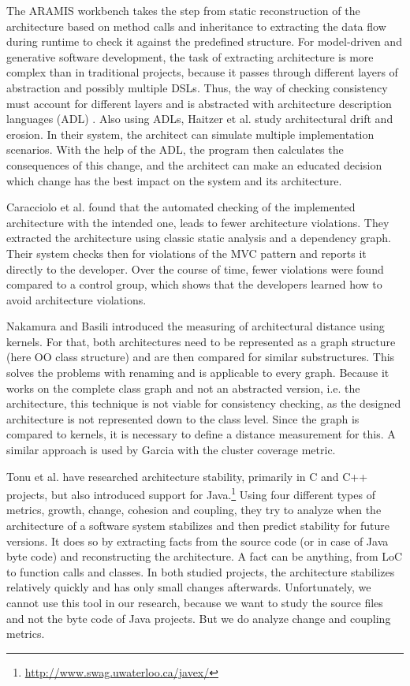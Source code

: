 \documentclass[conference]{IEEEtran}
\begin{document}
The ARAMIS workbench \cite{Aramis} takes the step from static reconstruction of the architecture based on method calls and inheritance to extracting the data flow during runtime to check it against the predefined structure. 
For model-driven and generative software development, the task of extracting architecture is more complex than in traditional projects, because it passes through different layers of abstraction and possibly multiple DSLs. 
Thus, the way of checking consistency must account for different layers and is abstracted with architecture description languages (ADL) \cite{ArcCons,Arc-MDSE}. 
Also using ADLs, Haitzer et al. \cite{Arc-Decision} study architectural drift and erosion. In their system, the architect can simulate multiple implementation scenarios. With the help of the ADL, the program then calculates the consequences of this change, and the architect can make an educated decision which change has the best impact on the system and its architecture. 

Caracciolo et al. \cite{ArcConf} found that the automated checking of the implemented architecture with the intended one, leads to fewer architecture violations. They extracted the architecture using classic static analysis and a dependency graph. Their system checks then for violations of the MVC pattern and reports it directly to the developer. Over the course of time, fewer violations were found compared to a control group, which shows that the developers learned how to avoid architecture violations.

Nakamura and Basili \cite{StructDist} introduced the measuring of architectural distance using kernels. For that, both architectures need to be represented as a graph structure (here OO class structure) and are then compared for similar substructures. This solves the problems with renaming and is applicable to every graph. 
Because it works on the complete class graph and not an abstracted version, i.e. the architecture, this technique is not viable for consistency checking, as the designed architecture is not represented down to the class level. 
Since the graph is compared to kernels, it is necessary to define a distance measurement for this. A similar approach is used by Garcia \cite{arcade-thesis} with the cluster coverage metric.

Tonu et al. \cite{Swag} have researched architecture stability, primarily in C and C++ projects, but also introduced support for Java.\footnote{\url{http://www.swag.uwaterloo.ca/javex/}} Using four different types of metrics, growth, change, cohesion and coupling, they try to analyze when the architecture of a software system stabilizes and then predict stability for future versions. It does so by extracting facts from the source code (or in case of Java byte code) and reconstructing the architecture. A fact can be anything, from LoC to function calls and classes. 
In both studied projects, the architecture stabilizes relatively quickly and has only small changes afterwards. Unfortunately, we cannot use this tool in our research, because we want to study the source files and not the byte code of Java projects. But we do analyze change and coupling metrics.
\end{document}
